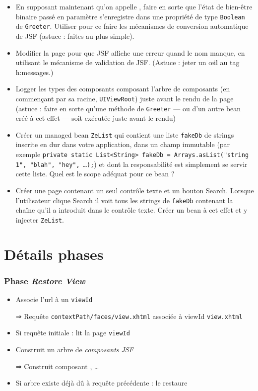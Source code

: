 \documentclass[english, french]{beamer}
\begin{document}
\begin{frame}[allowframebreaks]
\begin{itemize}
		\item En supposant maintenant qu’on appelle , faire en sorte que l’état de bien-être binaire passé en paramètre s’enregistre dans une propriété de type \texttt{Boolean} de \texttt{Greeter}. Utiliser pour ce faire les mécanismes de conversion automatique de JSF {\tiny (astuce : faites au plus simple)}.
		\item Modifier la page pour que JSF affiche une erreur quand le nom manque, en utilisant le mécanisme de validation de JSF. {\tiny (Astuce : jeter un œil au tag h:messages.)}%
		\item Logger les types des composants composant l’arbre de composants (en commençant par sa racine, \texttt{UIViewRoot}) juste avant le rendu de la page {\tiny (astuce : faire en sorte qu’une méthode de \texttt{Greeter} — ou d’un autre bean créé à cet effet — soit exécutée juste avant le rendu)}
		\item Créer un managed bean \texttt{ZeList} qui contient une liste \texttt{fakeDb} de strings inscrite en dur dans votre application, dans un champ immutable (par exemple \texttt{private static List<String> fakeDb = Arrays.asList("string 1", "blah", "hey", …);}) et dont la responsabilité est simplement se servir cette liste. Quel est le scope adéquat pour ce bean ?
		\item Créer une page  contenant un seul contrôle texte et un bouton Search. Lorsque l’utilisateur clique Search il voit tous les strings de \texttt{fakeDb} contenant la chaîne qu’il a introduit dans le contrôle texte. Créer un bean à cet effet et y injecter \texttt{ZeList}.
	\end{itemize}
\end{frame}

\appendix
\section{Détails phases}
\begin{frame}[label=ph-rv]
	\frametitle{Phase \emph{Restore View}}
	\begin{itemize}
		\item Associe l’url à un \texttt{viewId}
		\item[⇒] Requête \texttt{contextPath/faces/view.xhtml} associée à viewId \texttt{view.xhtml}
		\item Si requête initiale : lit la page \texttt{viewId}
		\item Construit un arbre de \emph{composants JSF}
		\item[⇒] Construit composant , …
		\item Si arbre existe déjà dû à requête précédente : le restaure
	\end{itemize}
\end{frame}
\end{document}
